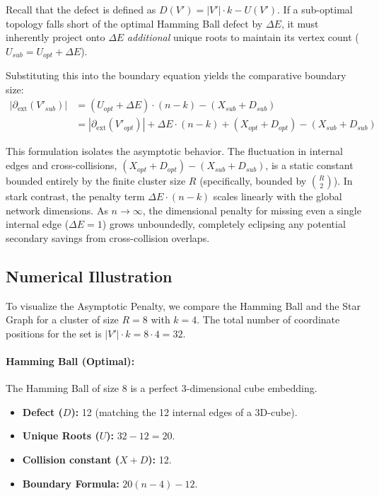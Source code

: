 \documentclass[11pt, letterpaper]{article}
\theoremstyle{definition}
\theoremstyle{remark}
\begin{document}
Recall that the defect is defined as $D(V') = |V'| \cdot k - U(V')$. If a sub-optimal topology falls short of the optimal Hamming Ball defect by $\Delta E$, it must inherently project onto $\Delta E$ \emph{additional} unique roots to maintain its vertex count ($U_{sub} = U_{opt} + \Delta E$).

Substituting this into the boundary equation yields the comparative boundary size:
\begin{align*}
\left| \partial_{\mathrm{ext}}(V'_{sub}) \right| &= (U_{opt} + \Delta E) \cdot (n - k) - (X_{sub} + D_{sub}) \\
&= \left| \partial_{\mathrm{ext}}(V'_{opt}) \right| + \Delta E \cdot (n - k) + (X_{opt} + D_{opt}) - (X_{sub} + D_{sub})
\end{align*}

This formulation isolates the asymptotic behavior. The fluctuation in internal edges and cross-collisions, $(X_{opt} + D_{opt}) - (X_{sub} + D_{sub})$, is a static constant bounded entirely by the finite cluster size $R$ (specifically, bounded by $\binom{R}{2}$). In stark contrast, the penalty term $\Delta E \cdot (n-k)$ scales linearly with the global network dimensions. As $n \to \infty$, the dimensional penalty for missing even a single internal edge ($\Delta E = 1$) grows unboundedly, completely eclipsing any potential secondary savings from cross-collision overlaps.

\subsection{Numerical Illustration}

To visualize the Asymptotic Penalty, we compare the Hamming Ball and the Star Graph for a cluster of size $R=8$ with $k=4$. The total number of coordinate positions for the set is $|V'| \cdot k = 8 \cdot 4 = 32$.

\paragraph{Hamming Ball (Optimal):}
The Hamming Ball of size 8 is a perfect 3-dimensional cube embedding.
\begin{itemize}
    \item \textbf{Defect ($D$):} 12 (matching the 12 internal edges of a 3D-cube).
    \item \textbf{Unique Roots ($U$):} $32 - 12 = 20$.
    \item \textbf{Collision constant ($X+D$):} 12.
    \item \textbf{Boundary Formula:} $20(n-4) - 12$.
\end{itemize}
\end{document}
